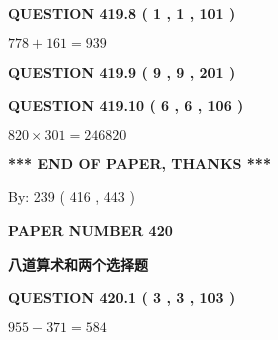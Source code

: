 \documentclass{ctexart}
\begin{document}
{\textbf{\Large{QUESTION
419.8 
 ( 1 , 1 , 101 )
}}}
  
  
 
 

$ %
778 +  %
161=   %
939$
 
 
  
\vspace{0.2in}
  
{\textbf{\Large{QUESTION
419.9 
 ( 9 , 9 , 201 )
}}}
  
  
  
\vspace{0.2in}
  
{\textbf{\Large{QUESTION
419.10 
 ( 6 , 6 , 106 )
}}}
  
  
 
 

$ %
820 \times  %
301=   %
246820$
 
 
   
   
 \vspace{0.2in}
 
   
   
   
   
\vspace{1.0in} 
{\textbf{\large{ *** END OF PAPER, THANKS *** }}} 
   
   
\hspace{1.0in} By: 
 239 ( 416 ,  443 )
   
   
   
   
\newpage 
\setcounter{page}{ 
   420001 } 
   
   
   
   
 {\textbf{ \Large{ PAPER NUMBER  420  }}}
   
   
\vspace{0.2in}
   
   
   
   
   
   
 \vspace{0.2in}
{\LARGE {\textbf{ 八道算术和两个选择题}}}
   
   
  
\vspace{0.2in}
  
{\textbf{\Large{QUESTION
420.1 
 ( 3 , 3 , 103 )
}}}
  
  
 
 

$ %
955 -  %
371=   %
584$
 
 
  
\end{document}
